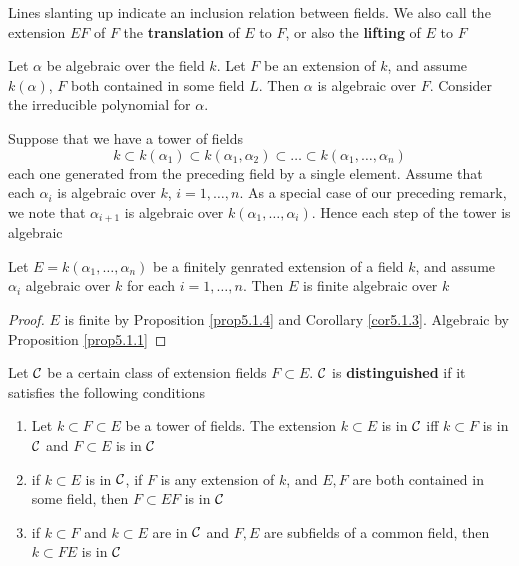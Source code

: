 \documentclass[11pt]{article}
\begin{document}
Lines slanting up indicate an inclusion relation between fields. We also call the
extension \(EF\) of \(F\) the \textbf{translation} of \(E\) to \(F\), or also the \textbf{lifting} of \(E\)
to \(F\)

Let \(\alpha\) be algebraic over the field \(k\). Let \(F\) be an extension of \(k\), and
assume \(k(\alpha)\), \(F\) both contained in some field \(L\). Then \(\alpha\) is algebraic over \(F\).
Consider the irreducible polynomial for \(\alpha\).

Suppose that we have a tower of fields
\begin{equation*}
k\subset k(\alpha_1)\subset k(\alpha_1,\alpha_2)\subset\dots\subset k(\alpha_1,\dots,\alpha_n)
\end{equation*}
each one generated from the preceding field by a single element. Assume that each \(\alpha_i\) is
algebraic over \(k\), \(i=1,\dots,n\). As a special case of our preceding remark, we note
that \(\alpha_{i+1}\) is algebraic over \(k(\alpha_1,\dots,\alpha_i)\). Hence each step of the tower is algebraic

\begin{proposition}[]
Let \(E=k(\alpha_1,\dots,\alpha_n)\) be a finitely genrated extension of a field \(k\), and assume \(\alpha_i\)
algebraic over \(k\) for each \(i=1,\dots,n\). Then \(E\) is finite algebraic over \(k\)
\end{proposition}

\begin{proof}
\(E\) is finite by Proposition \ref{prop5.1.4} and Corollary \ref{cor5.1.3}. Algebraic by Proposition \ref{prop5.1.1}
\end{proof}

Let \(\mathcal{C}\) be a certain class of extension fields \(F\subset E\). \(\mathcal{C}\) is \textbf{distinguished} if it satisfies
the following conditions
\begin{enumerate}
\item Let \(k\subset F\subset E\) be a tower of fields. The extension \(k\subset E\) is in \(\mathcal{C}\) iff \(k\subset F\) is
in \(\mathcal{C}\) and \(F\subset E\) is in \(\mathcal{C}\)
\item if \(k\subset E\) is in \(\mathcal{C}\), if \(F\) is any extension of \(k\), and \(E,F\) are both contained in
some field, then \(F\subset EF\) is in \(\mathcal{C}\)
\item if \(k\subset F\) and \(k\subset E\) are in \(\mathcal{C}\) and \(F,E\) are subfields of a common field,
then \(k\subset FE\) is in \(\mathcal{C}\)
\end{enumerate}
\end{document}
